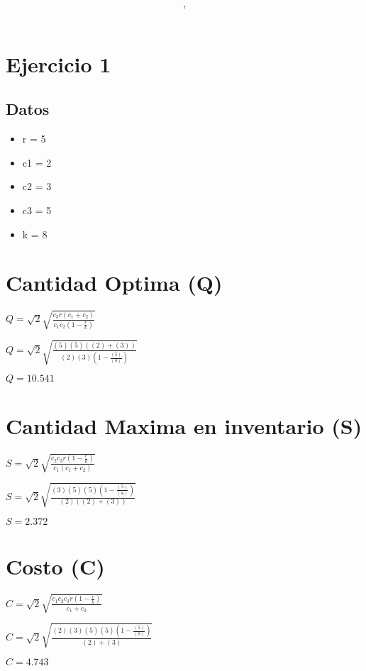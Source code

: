 \documentclass{article}
\author{\nombre , \carnet}
\title{\textbf{\Huge\titulo}}
\newcommand*\rbreak{\par\noindent\linebreak}
\begin{document}
%

\maketitle


\section{Ejercicio 1}
\subsection{\Huge Datos}
\begin{huge}
\begin{itemize}
\item r = 5
\item c1 = 2
\item c2 = 3
\item c3 = 5
\item k = 8
\end{itemize}
\end{huge}\section{\Huge Cantidad Optima (Q)}
\begin{huge}
$Q = \sqrt{2} \sqrt{\frac{c_{3} r \left(c_{1} + c_{2}\right)}{c_{1} c_{2} \left(1 - \frac{r}{k}\right)}}$\rbreak
$Q = \sqrt{2} \sqrt{\frac{(5)  (5)  \left((2) + (3)\right)}{(2) (3) \left(1 - \frac{ (5) }{ (8) }\right)}}$\rbreak
$Q = 10.541$
\end{huge}
\section{\Huge Cantidad Maxima en inventario (S)}
\begin{huge}
$S = \sqrt{2} \sqrt{\frac{c_{2} c_{3} r \left(1 - \frac{r}{k}\right)}{c_{1} \left(c_{1} + c_{2}\right)}}$\rbreak
$S = \sqrt{2} \sqrt{\frac{(3) (5)  (5)  \left(1 - \frac{ (5) }{ (8) }\right)}{(2) \left((2) + (3)\right)}}$\rbreak
$S = 2.372$
\end{huge}
\section{\Huge Costo (C)}
\begin{huge}
$C = \sqrt{2} \sqrt{\frac{c_{1} c_{2} c_{3} r \left(1 - \frac{r}{k}\right)}{c_{1} + c_{2}}}$\rbreak
$C = \sqrt{2} \sqrt{\frac{(2) (3) (5)  (5)  \left(1 - \frac{ (5) }{ (8) }\right)}{(2) + (3)}}$\rbreak
$C = 4.743$
\end{huge}
\end{document}
